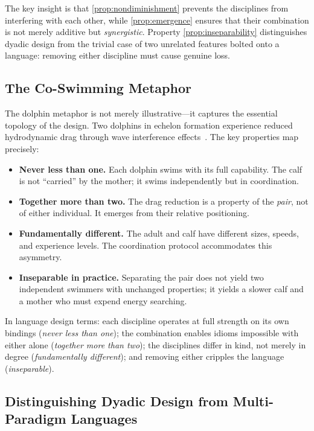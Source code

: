 \documentclass[11pt,a4paper]{article}
\begin{document}
The key insight is that \ref{prop:nondiminishment} prevents the disciplines
from interfering with each other, while \ref{prop:emergence} ensures that their
combination is not merely additive but \emph{synergistic}. Property
\ref{prop:inseparability} distinguishes dyadic design from the trivial case of
two unrelated features bolted onto a language: removing either discipline must
cause genuine loss.

\subsection{The Co-Swimming Metaphor}

The dolphin metaphor is not merely illustrative---it captures the essential
topology of the design. Two dolphins in echelon formation experience reduced
hydrodynamic drag through wave interference effects~\citep{weihs2004mechanics}.
The key properties map precisely:

\begin{itemize}
  \item \textbf{Never less than one.} Each dolphin swims with its full
    capability. The calf is not ``carried'' by the mother; it swims
    independently but in coordination.
  \item \textbf{Together more than two.} The drag reduction is a property of
    the \emph{pair}, not of either individual. It emerges from their relative
    positioning.
  \item \textbf{Fundamentally different.} The adult and calf have different
    sizes, speeds, and experience levels. The coordination protocol accommodates
    this asymmetry.
  \item \textbf{Inseparable in practice.} Separating the pair does not yield
    two independent swimmers with unchanged properties; it yields a slower calf
    and a mother who must expend energy searching.
\end{itemize}

In language design terms: each discipline operates at full strength on its own
bindings (\emph{never less than one}); the combination enables idioms impossible
with either alone (\emph{together more than two}); the disciplines differ in
kind, not merely in degree (\emph{fundamentally different}); and removing either
cripples the language (\emph{inseparable}).

\subsection{Distinguishing Dyadic Design from Multi-Paradigm Languages}
\end{document}
